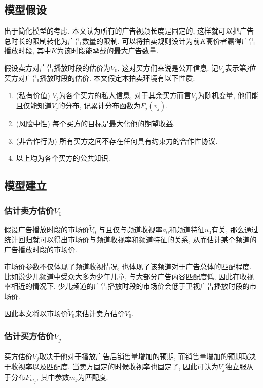 \subsection{模型假设}

出于简化模型的考虑, 本文认为所有的广告视频长度是固定的,
这样就可以把广告总时长的限制转化为广告数量的限制,
可以将拍卖规则设计为前$K$高价者赢得广告播放时段,
其中$K$为该时段能承载的最大广告数量.

假设卖方对广告播放时段的估价为$V_{0}$,
这对买方们来说是公开信息.
记$V_{j}$表示第$j$位买方对广告播放时段的估价.
本文假定本拍卖环境有以下性质:
\begin{enumerate}[({A}1)]
    \item (私有价值) $V_{j}$为各个买方的私人信息,
        对于其余买方而言$V_{j}$为随机变量,
        他们能且仅能知道$V_{j}$的分布, 记累计分布函数为$F_{j}(v_{j})$.
    \item (风险中性) 每个买方的目标是最大化他的期望收益.
    \item (非合作行为) 所有买方之间不存在任何具有约束力的合作性协议.
    \item 以上均为各个买方的公共知识.
\end{enumerate}

\subsection{模型建立}

\subsubsection{估计卖方估价$V_{0}$}

假设广告播放时段的市场价$\tilde{V}_{0}$
与且仅与频道收视率$a_{0}$和频道特征$u_{0}$有关,
那么通过统计回归就可以得出市场价与频道收视率和频道特征的关系,
从而估计某个频道的广告播放时段的市场价.

市场价参数不仅体现了频道收视情况, 也体现了该频道对于广告总体的匹配程度.
比如说少儿频道中受众大多为少年儿童, 与大部分广告内容匹配度低,
因此在收视率相近的情况下,
少儿频道的广告播放时段的市场价会低于卫视广告播放时段的市场价.

因此本文将以市场价$\tilde{V}_{0}$来估计卖方估价$V_{0}$.

\subsubsection{估计买方估价$V_{j}$}

买方估价$V_{j}$取决于他对于播放广告后销售量增加的预期,
而销售量增加的预期取决于收视率以及匹配度. 当卖方固定的时候收视率也固定了,
因此可认为$V_{j}$独立服从于分布$F_{m_{j}}$, 其中参数$m_{j}$为匹配度.

